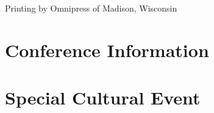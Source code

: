 \documentclass[twoside,makeidx]{book}
\begin{document}
\fancyfoot[C]{}


\fancyfoot[C]{\thepage}



\clearpage
\thispagestyle{empty}
\mbox{}
\vfill
\noindent Printing by Omnipress of Madison, Wisconsin \\
\newpage

\frontmatter


\setcounter{tocdepth}{2}
\tableofcontents
\mainmatter
\pagestyle{fancy}


\chapter{Conference Information}


\clearpage


\clearpage%
\setheaders{}{}


\clearpage
%
\clearpage%
\setheaders{}{}

%

\clearpage











\chapter[Special Cultural Event]{Special Cultural Event}
\thispagestyle{emptyheader}



\end{document}
